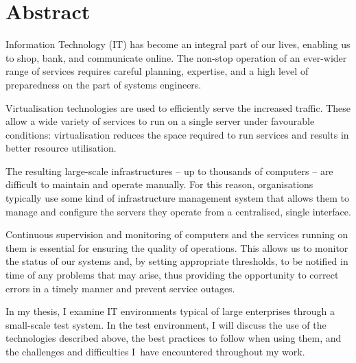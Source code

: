 \chapter*{Abstract}

Information Technology (IT) has become an integral part of our lives, enabling us to shop, bank, and communicate online. The non-stop operation of an ever-wider range of services requires careful planning, expertise, and a high level of preparedness on the part of systems engineers.

Virtualisation technologies are used to efficiently serve the increased traffic. These allow a wide variety of services to run on a single server under favourable conditions: virtualisation reduces the space required to run services and results in better resource utilisation.

The resulting large-scale infrastructures -- up to thousands of computers -- are difficult to maintain and operate manually. For this reason, organisations typically use some kind of infrastructure management system that allows them to manage and configure the servers they operate from a centralised, single interface.

Continuous supervision and monitoring of computers and the services running on them is essential for ensuring the quality of operations. This allows us to monitor the status of our systems and, by setting appropriate thresholds, to be notified in time of any problems that may arise, thus providing the opportunity to correct errors in a timely manner and prevent service outages.

In my thesis, I examine IT environments typical of large enterprises through a small-scale test system. In the test environment, I will discuss the use of the technologies described above, the best practices to follow when using them, and the challenges and difficulties I~have encountered throughout my work.


\vfill
\selectthesislanguage

\setcounter{romanPage}{\value{page}}
